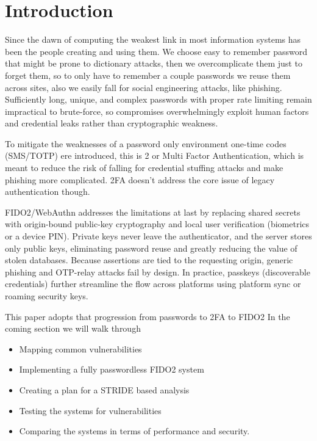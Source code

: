 \section{Introduction}
Since the dawn of computing the weakest link in most information systems has been the people creating and using them. We choose easy to remember password that might be prone to dictionary attacks, then we overcomplicate them just to forget them, so to only have to remember a couple passwords we reuse them across sites, also we easily fall for social engineering attacks, like phishing. Sufficiently long, unique, and complex passwords with proper rate limiting remain impractical to brute-force, so compromises overwhelmingly exploit human factors and credential leaks rather than cryptographic weakness. 

To mitigate the weaknesses of a password only environment one-time codes (SMS/TOTP) ere introduced, this is 2 or Multi Factor Authentication, which is meant to reduce the risk of falling for credential stuffing attacks and make phishing more complicated. 2FA doesn't address the core issue of legacy authentication though.

FIDO2/WebAuthn addresses the limitations at last by replacing shared secrets with origin-bound public-key cryptography and local user verification (biometrics or a device PIN). Private keys never leave the authenticator, and the server stores only public keys, eliminating password reuse and greatly reducing the value of stolen databases. Because assertions are tied to the requesting origin, generic phishing and OTP-relay attacks fail by design. In practice, passkeys (discoverable credentials) further streamline the flow across platforms using platform sync or roaming security keys.

This paper adopts that progression from passwords to 2FA to FIDO2 
In the coming section we will walk through 
\begin{itemize}
    \item Mapping common vulnerabilities
    \item Implementing a fully passwordless FIDO2 system
    \item Creating a plan for a STRIDE based analysis
    \item Testing the systems for vulnerabilities
    \item Comparing the systems in terms of performance and security.
\end{itemize}